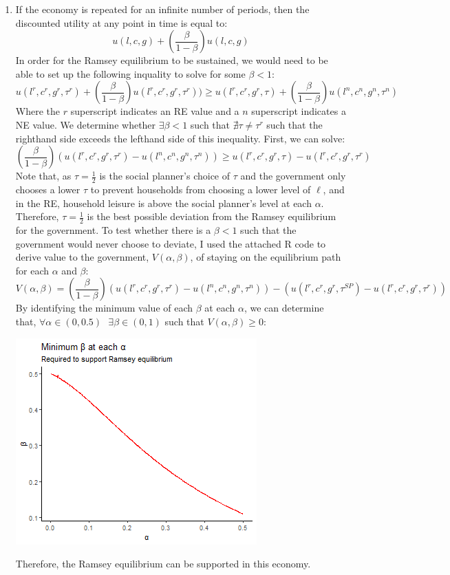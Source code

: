 \documentclass{article}
\begin{document}
\begin{enumerate}
	\item If the economy is repeated for an infinite number of periods, then the discounted utility at any point in time is equal to:
		\[
			u(l,c,g) + \left(\frac{\beta}{1-\beta}\right)u(l,c,g)
		\]
		In order for the Ramsey equilibrium to be sustained, we would need to be able to set up the following inquality to solve for some $\beta<1$:
		\[
			u(l^r,c^r,g^r,\tau^r) + \left(\frac{\beta}{1-\beta}\right)u(l^r,c^r,g^r,\tau^r))\geq 
			u(l^r,c^r,g^r,\tau) + \left(\frac{\beta}{1-\beta}\right)u(l^n,c^n,g^n,\tau^n)
		\]
		Where the $r$ superscript indicates an RE value and a $n$ superscript indicates a NE value. We determine whether $\exists\beta<1$ such that $\nexists\tau\neq\tau^r$ such that the righthand side exceeds the lefthand side of this inequality. First, we can solve:
		\[
			\left(\frac{\beta}{1-\beta}\right)\left(u(l^r,c^r,g^r,\tau^r)-u(l^n,c^n,g^n,\tau^n)\right)\geq u(l^r,c^r,g^r,\tau)-u(l^r,c^r,g^r,\tau^r)
		\]	
		Note that, as $\tau=\frac{1}{2}$ is the social planner's choice of $\tau$ and the government only chooses a lower $\tau$ to prevent households from choosing a lower level of $\ell$, and in the RE, household leisure is above the social planner's level at each $\alpha$. Therefore, $\tau=\frac{1}{2}$ is the best possible deviation from the Ramsey equilibrium for the government. To test whether there is a $\beta<1$ such that the government would never choose to deviate, I used the attached R code to derive value to the government, $V(\alpha,\beta)$, of staying on the equilibrium path for each $\alpha$ and $\beta$:
		\[
			V(\alpha,\beta)=\left(\frac{\beta}{1-\beta}\right)\left(u(l^r,c^r,g^r,\tau^r)-u(l^n,c^n,g^n,\tau^n)\right)-\left(u(l^r,c^r,g^r,\tau^{SP}
			)-u(l^r,c^r,g^r,\tau^r)\right)
		\]
		By identifying the minimum value of each $\beta$ at each $\alpha$, we can determine that, ${\forall\alpha\in(0,0.5)\text{ }\exists\beta\in(0,1)}$ such that ${V(\alpha,\beta)\geq0}$:
		\begin{center}
			\includegraphics[scale=.75]{figure3.png}
		\end{center}
		Therefore, the Ramsey equilibrium can be supported in this economy.
		
\end{enumerate}


\end{document}
